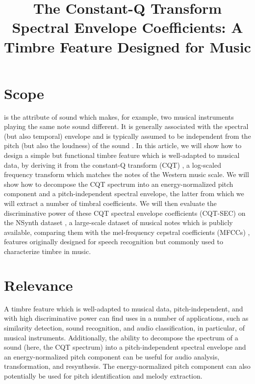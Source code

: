 \documentclass[journal]{IEEEtran}
\begin{document}
\title{The Constant-Q Transform Spectral Envelope Coefficients: A Timbre Feature Designed for Music}

\maketitle

\section{Scope}

 is the attribute of sound which makes, for example, two musical instruments playing the same note sound different. It is generally associated with the spectral (but also temporal) envelope and is typically assumed to be independent from the pitch (but also the loudness) of the sound \cite{moore2004}. In this article, we will show how to design a simple but functional timbre feature which is well-adapted to musical data, by deriving it from the constant-Q transform (CQT) \cite{brown1991, brown1992}, a log-scaled frequency transform which matches the notes of the Western music scale. We will show how to decompose the CQT spectrum into an energy-normalized pitch component and a pitch-independent spectral envelope, the latter from which we will extract a number of timbral coefficients. We will then evaluate the discriminative power of these CQT spectral envelope coefficients (CQT-SEC) on the NSynth dataset \cite{engel2017}, a large-scale dataset of musical notes which is publicly available, comparing them with the mel-frequency cepstral coefficients (MFCCs) \cite{mermelstein1976}, features originally designed for speech recognition but commonly used to characterize timbre in music. 


\section{Relevance}

A timbre feature which is well-adapted to musical data, pitch-independent, and with high discriminative power can find uses in a number of applications, such as similarity detection, sound recognition, and audio classification, in particular, of musical instruments. Additionally, the ability to decompose the spectrum of a sound (here, the CQT spectrum) into a pitch-independent spectral envelope and an energy-normalized pitch component can be useful for audio analysis, transformation, and resynthesis. The energy-normalized pitch component can also potentially be used for pitch identification and melody extraction. 
\end{document}
